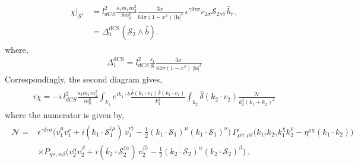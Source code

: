 \begin{align}
\begin{split} \label{eqt23} 
 \chi\Big|_{\mathcal{S}^1}&=l_{dCS}^2\frac{s_1 m_1 m_2^2}{8 m_p^6}\frac{ 3 x\,}{64\pi (1-x^2)\,|\boldsymbol{b}|^4}\,\epsilon^{\gamma\delta\tau\sigma}v_{2\sigma}\mathcal{S}_{2\gamma\delta}\,\hat{b}_\tau\,,\\ &=\Delta_{\mathfrak{1}}^{\textrm{dCS}}\left(\mathcal{S}_2\wedge \hat b\right).
\end{split}
\end{align}
where,
\begin{align}
\Delta_{\mathfrak{1}}^{\textrm{dCS}}=l_{dCS}^2\frac{s_1 }{8 }\frac{ 3 x\,}{64\pi (1-x^2)\,|\boldsymbol{b}|^4}
\end{align}
Correspondingly, the second diagram gives,
\begin{align}
    \begin{split}
      i  \chi=-i\,l_{dCS} ^2\frac{s_2m_1 m_2^2}{m_p^6}\int_{k_1}e^{ik_1\cdot b}\frac{\hat\delta(k_1\cdot v_1)\hat\delta(k_1\cdot v_2)}{k_1^2}\int_{k_2}\hat\delta(k_2\cdot v_2)\frac{\mathcal{N}}{k_2^2(k_1+k_2)^2}
    \end{split}
\end{align}
where the numerator is given by,
\begin{align}
    \begin{split}
        \mathcal{N}=&\epsilon^{\gamma\delta\tau\sigma}\Bigg(v_1^\mu v_1^\nu+i(k_1\cdot \mathcal{S}_1^{(\mu})\,v_1^{\nu)}-\frac{1}{2}(k_1\cdot \mathcal{S}_1)^\mu (k_1\cdot \mathcal{S}_1)^{\nu}\Bigg)\,P_{\mu\nu,\rho\sigma}\Bigg(k_{1\tau}k_{2\gamma}k_1^{\chi}k_2^\rho-\eta^{\rho\chi}(k_1\cdot k_2)\Bigg)\\ &
        \times P_{\chi\varepsilon,\alpha\beta}\Bigg(v_2^\alpha v_2^\beta+i(k_2\cdot \mathcal{S}_2^{(\alpha})\,v_2^{\beta)}-\frac{1}{2}(k_2\cdot \mathcal{S}_2)^\alpha (k_2\cdot \mathcal{S}_2)^{\beta}\Bigg)\,.
    \end{split}
\end{align}
